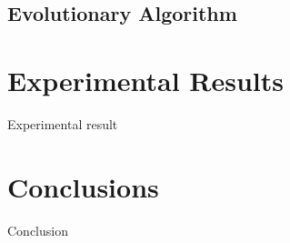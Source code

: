 \documentclass{svproc}
\begin{document}
\subsection{Evolutionary Algorithm}


\section{Experimental Results}
Experimental result

\section{Conclusions}
Conclusion
%
%
\end{document}
